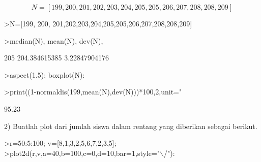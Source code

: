\documentclass[12pt,arial,letterpaper]{book}
\begin{document}
\begin{eulercomment}
\begin{eulercomment}
\begin{eulercomment}
\begin{eulercomment}
\begin{eulercomment}
\begin{eulercomment}
\begin{eulercomment}
\begin{eulercomment}
\begin{eulercomment}
\begin{eulercomment}
\begin{eulercomment}
\begin{eulercomment}
\begin{eulercomment}
\begin{eulercomment}
\begin{eulercomment}
\begin{eulercomment}
\begin{eulercomment}
\begin{eulercomment}
\begin{eulercomment}
\begin{eulercomment}
\begin{eulercomment}
\begin{eulercomment}
\begin{eulercomment}
\begin{eulercomment}
\begin{eulercomment}
\begin{eulercomment}
\begin{eulercomment}
\begin{eulercomment}
\begin{eulercomment}
\begin{eulercomment}
\begin{eulercomment}
\begin{eulercomment}
\begin{eulercomment}
\end{eulercomment}
\begin{eulerformula}
\[
N=[199,200,201,202,203,204,205,205,206,207,208,208,209]
\]
\end{eulerformula}
\begin{eulercomment}
\end{eulercomment}
\begin{eulerprompt}
>N=[199, 200, 201,202,203,204,205,205,206,207,208,208,209]
\end{eulerprompt}
\begin{euleroutput}
  [199,  200,  201,  202,  203,  204,  205,  205,  206,  207,  208,  208,
  209]
\end{euleroutput}
\begin{eulerprompt}
>median(N), mean(N), dev(N),
\end{eulerprompt}
\begin{euleroutput}
  205
  204.384615385
  3.22847904176
\end{euleroutput}
\begin{eulerprompt}
>aspect(1.5); boxplot(N):
\end{eulerprompt}
\begin{eulerprompt}
>print((1-normaldis(199,mean(N),dev(N)))*100,2,unit=" %
\end{eulerprompt}
\begin{euleroutput}
       95.23 %
\end{euleroutput}
\begin{eulercomment}
2) Buatlah plot dari jumlah siswa dalam rentang yang diberikan sebagai
berikut.
\end{eulercomment}
\begin{eulerprompt}
>r=50:5:100; v=[8,1,3,2,5,6,7,2,3,5];
>plot2d(r,v,a=40,b=100,c=0,d=10,bar=1,style="\(\backslash\)/"):
\end{eulerprompt}

\end{eulercomment}
\end{eulercomment}
\end{eulercomment}
\end{eulercomment}
\end{eulercomment}
\end{eulercomment}
\end{eulercomment}
\end{eulercomment}
\end{eulercomment}
\end{eulercomment}
\end{eulercomment}
\end{eulercomment}
\end{eulercomment}
\end{eulercomment}
\end{eulercomment}
\end{eulercomment}
\end{eulercomment}
\end{eulercomment}
\end{eulercomment}
\end{eulercomment}
\end{eulercomment}
\end{eulercomment}
\end{eulercomment}
\end{eulercomment}
\end{eulercomment}
\end{eulercomment}
\end{eulercomment}
\end{eulercomment}
\end{eulercomment}
\end{eulercomment}
\end{eulercomment}
\end{eulercomment}
\end{document}
